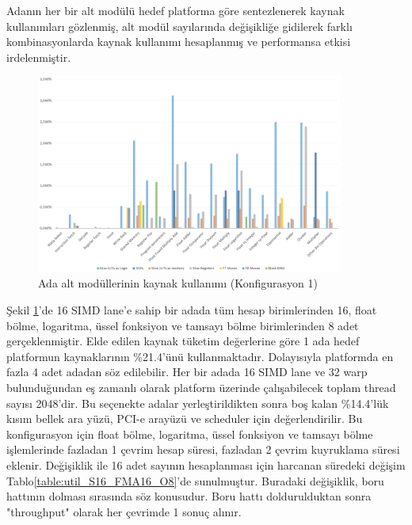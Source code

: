 Adanın her bir alt modülü hedef platforma göre sentezlenerek kaynak kullanımları gözlenmiş, alt modül sayılarında değişikliğe gidilerek farklı kombinasyonlarda kaynak kullanımı hesaplanmış ve performansa etkisi irdelenmiştir.\par
\begin{figure}[ht]
\centering
\shorthandoff{=}
\includegraphics[width=0.9\textwidth]{gorsel/Util_S16_FMA16_O8.png}
\shorthandoff{=}
\caption{Ada alt modüllerinin kaynak kullanımı (Konfigurasyon 1)}
\label{image:util_S16_FMA16_O8}
\end{figure}
Şekil \ref{image:util_S16_FMA16_O8}'de 16 SIMD lane'e sahip bir adada tüm hesap birimlerinden 16, float bölme, logaritma, üssel fonksiyon ve tamsayı bölme birimlerinden 8 adet gerçeklenmiştir. Elde edilen kaynak tüketim değerlerine göre 1 ada hedef platformun kaynaklarının \%21.4'ünü kullanmaktadır. Dolayısıyla platformda en fazla 4 adet adadan söz edilebilir. Her bir adada 16 SIMD lane ve 32 warp bulunduğundan eş zamanlı olarak platform üzerinde çalışabilecek toplam thread sayısı 2048'dir. Bu seçenekte adalar yerleştirildikten sonra boş kalan \%14.4'lük kısım bellek ara yüzü, PCI-e arayüzü ve scheduler için değerlendirilir. Bu konfigurasyon için float bölme, logaritma, üssel fonksiyon ve tamsayı bölme işlemlerinde fazladan 1 çevrim hesap süresi, fazladan 2 çevrim kuyruklama süresi eklenir. Değişiklik ile 16 adet sayının hesaplanması için harcanan süredeki değişim Tablo\ref{table:util_S16_FMA16_O8}'de sunulmuştur. Buradaki değişiklik, boru hattının dolması sırasında söz konusudur. Boru hattı doldurulduktan sonra "throughput" olarak her çevrimde 1 sonuç alınır.\par 

